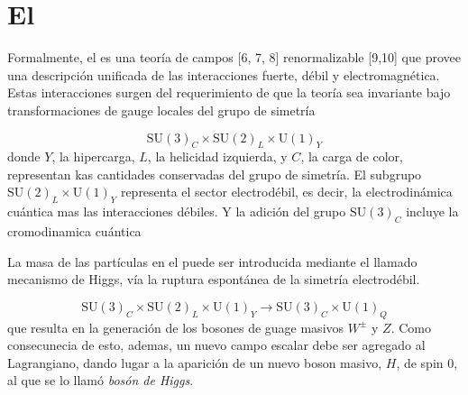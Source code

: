 \section{El \SM}

Formalmente, el {\SM} es una teoría de campos [6, 7, 8] renormalizable [9,10] que provee una descripción
unificada de las interacciones fuerte, débil y electromagnética. Estas interacciones surgen del
requerimiento de que la teoría sea invariante bajo transformaciones de gauge locales del grupo
de simetría


\begin{equation}
  \text{SU}(3)_C \times \text{SU}(2)_L \times \text{U}(1)_Y
\end{equation}
%
donde $Y$, la hipercarga, $L$, la helicidad izquierda, y $C$, la carga de color, representan
kas cantidades conservadas del grupo de simetría. El subgrupo $\text{SU}(2)_L \times \text{U}(1)_Y$
representa el sector electrodébil, es decir, la electrodinámica cuántica mas las interacciones
débiles. Y la adición del grupo $\text{SU}(3)_C$ incluye la cromodinamica cuántica


La masa de las part\'iculas en el {\SM} puede ser introducida mediante el llamado mecanismo
de Higgs\cite{PhysRevLett.13.321, PhysRevLett.13.508}, vía la ruptura espontánea de la simetría
electrodébil.

\begin{equation}
  \text{SU}(3)_C \times \text{SU}(2)_L \times \text{U}(1)_Y \to \text{SU}(3)_C \times \text{U}(1)_Q
\end{equation}
%
que resulta en la generación de los bosones de guage masivos $W^\pm$ y $Z$. Como consecunecia de esto,
ademas, un nuevo campo escalar debe ser agregado al Lagrangiano, dando lugar a la
aparici\'on de un nuevo boson masivo, $H$, de spin 0, al que se lo llam\'o \emph{bos\'on de Higgs}.

